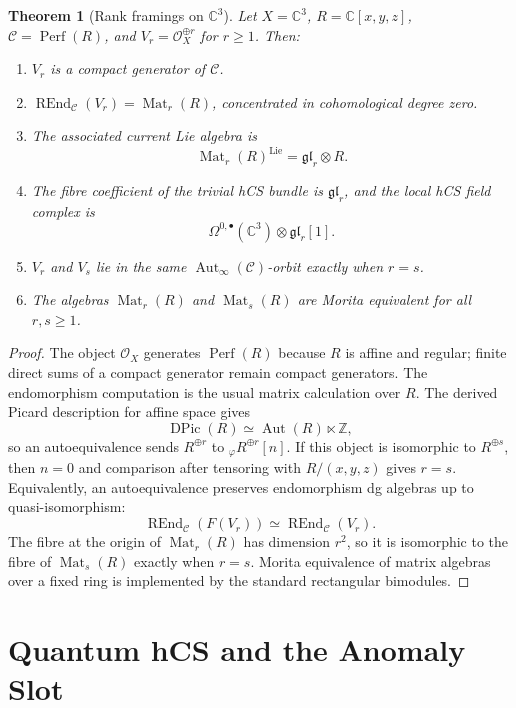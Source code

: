 \documentclass[11pt]{amsart}
\theoremstyle{plain}
\newtheorem{theorem}{Theorem}[section]
\theoremstyle{definition}
\theoremstyle{remark}
\providecommand{\C}{\mathbb{C}}
\providecommand{\Z}{\mathbb{Z}}
\providecommand{\cC}{\mathcal{C}}
\providecommand{\cO}{\mathcal{O}}
\providecommand{\fgl}{\mathfrak{gl}}
\providecommand{\Perf}{\operatorname{Perf}}
\providecommand{\REnd}{\operatorname{REnd}}
\providecommand{\Aut}{\operatorname{Aut}}
\begin{document}
\begin{theorem}[Rank framings on \(\C^3\)]
\label{thm:c3-rank-framings}
Let \(X=\C^3\), \(R=\C[x,y,z]\), \(\cC=\Perf(R)\), and
\(V_r=\cO_X^{\oplus r}\) for \(r\geq1\). Then:
\begin{enumerate}[label=\textup{(\roman*)}]
\item \(V_r\) is a compact generator of \(\cC\).
\item \(\REnd_{\cC}(V_r)=\operatorname{Mat}_r(R)\), concentrated in
cohomological degree zero.
\item The associated current Lie algebra is
\[
  \operatorname{Mat}_r(R)^{\operatorname{Lie}}
  =
  \fgl_r\otimes R .
\]
\item The fibre coefficient of the trivial hCS bundle is \(\fgl_r\),
and the local hCS field complex is
\[
  \Omega^{0,\bullet}(\C^3)\otimes\fgl_r[1].
\]
\item \(V_r\) and \(V_s\) lie in the same \(\Aut_\infty(\cC)\)-orbit
exactly when \(r=s\).
\item The algebras \(\operatorname{Mat}_r(R)\) and
\(\operatorname{Mat}_s(R)\) are Morita equivalent for all \(r,s\geq1\).
\end{enumerate}
\end{theorem}

\begin{proof}
The object \(\cO_X\) generates \(\Perf(R)\) because \(R\) is affine and
regular; finite direct sums of a compact generator remain compact
generators. The endomorphism computation is the usual matrix
calculation over \(R\). The derived Picard description for affine
space gives
\[
  \operatorname{DPic}(R)
  \simeq
  \Aut(R)\ltimes\Z,
\]
so an autoequivalence sends \(R^{\oplus r}\) to
\({}_{\varphi}R^{\oplus r}[n]\). If this object is isomorphic to
\(R^{\oplus s}\), then \(n=0\) and comparison after tensoring with
\(R/(x,y,z)\) gives \(r=s\). Equivalently, an autoequivalence preserves
endomorphism dg algebras up to quasi-isomorphism:
\[
  \REnd_{\cC}(F(V_r))\simeq \REnd_{\cC}(V_r).
\]
The fibre at the origin of \(\operatorname{Mat}_r(R)\) has dimension
\(r^2\), so it is isomorphic to the fibre of
\(\operatorname{Mat}_s(R)\) exactly when \(r=s\). Morita equivalence of
matrix algebras over a fixed ring is implemented by the standard
rectangular bimodules.
\end{proof}

\section{Quantum hCS and the Anomaly Slot}
\label{sec:quantum-hcs-anomaly-slot}
\end{document}
